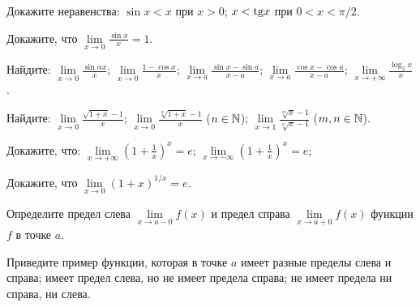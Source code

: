 \documentclass[a4paper, 12pt]{article}
\newcommand{\0}[1]{\overline{#1}}
\begin{document}



Докажите неравенства:
 $\sin x<x$ при $x>0$;
 $x<{\rm tg} x$ при $0<x<\pi/2$.

 Докажите, что
$\lim\limits_{x\to0}\frac{\sin x}x=1$.

 Найдите:
 $\lim\limits_{x\to0}\frac{\sin{\alpha x}}{x}$;
 $\lim\limits_{x\to0}\frac{1-\cos x}x$;
 $\lim\limits_{x\to a}\frac{\sin x-\sin a}{x-a}$;
 $\lim\limits_{x\to a}\frac{\cos x-\cos a}{x-a}$;
 $\lim\limits_{x\to +\infty}\frac{\log_2 x}{x}$.

 Найдите:
 $\lim\limits_{x \to 0} \frac{\sqrt{1+x}-1}x$;
 $\lim\limits_{x \to 0} \frac{\sqrt[n]{1+x}-1}x$ ($n\in \mathbb{N}$);
 $\lim\limits_{x \to 1} \frac{\sqrt[m]{x}-1}{\sqrt[n]{x}-1}$
($m,n\in \mathbb{N}$).

 Докажите, что:
 $\lim\limits_{x \to +\infty} \left(1+\frac1x\right)^x=e$;
 $\lim\limits_{x \to -\infty} \left(1+\frac1x\right)^x=e$;

 Докажите, что
$\lim\limits_{x \to 0} (1+x)^{1/x}=e$.



 Определите предел слева $\lim\limits_{x \to a-0} f(x)$ и предел справа $\lim\limits_{x \to a+0} f(x)$ функции $f$ в точке $a$.



 Приведите пример функции, которая в точке $a$
 имеет разные пределы слева и справа;
 имеет предел слева, но не имеет предела справа;
 не имеет предела ни справа, ни слева.
\end{document}
